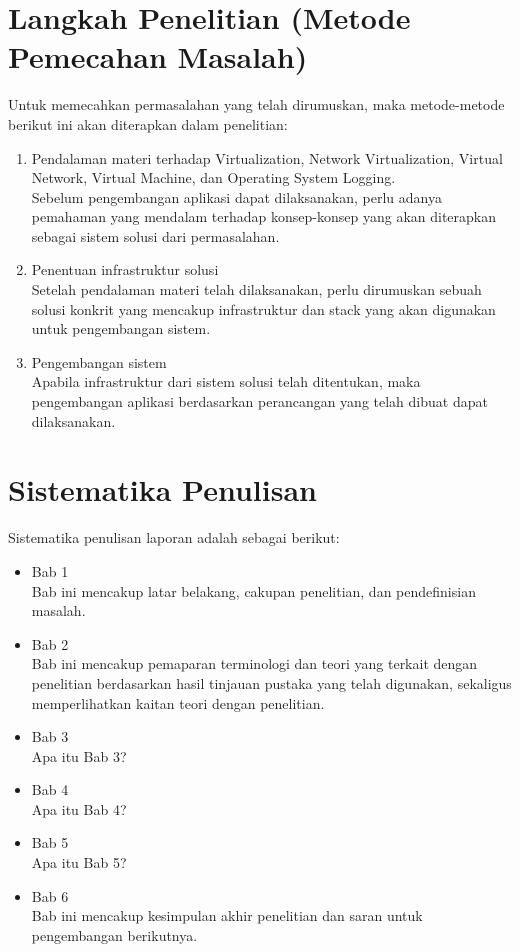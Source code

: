 \section{Langkah Penelitian (Metode Pemecahan Masalah)}
\label{sec:langkahPenelitian}
Untuk memecahkan permasalahan yang telah dirumuskan, maka metode-metode berikut ini akan diterapkan dalam penelitian:
\begin{enumerate}
	\item Pendalaman materi terhadap Virtualization, Network Virtualization, Virtual Network, Virtual Machine, dan Operating System Logging. \\
	Sebelum pengembangan aplikasi dapat dilaksanakan, perlu adanya pemahaman yang mendalam terhadap konsep-konsep yang akan diterapkan sebagai sistem solusi dari permasalahan.
	\item Penentuan infrastruktur solusi \\
	Setelah pendalaman materi telah dilaksanakan, perlu dirumuskan sebuah solusi konkrit yang mencakup infrastruktur dan stack yang akan digunakan untuk pengembangan sistem.
	\item Pengembangan sistem \\
	Apabila infrastruktur dari sistem solusi telah ditentukan, maka pengembangan aplikasi berdasarkan perancangan yang telah dibuat dapat dilaksanakan.
\end{enumerate}


\section{Sistematika Penulisan}
\label{sec:sistematikaPenulisan}
Sistematika penulisan laporan adalah sebagai berikut:
\begin{itemize}
	\item Bab 1 \babSatu \\
	    Bab ini mencakup latar belakang, cakupan penelitian, dan pendefinisian masalah.
	\item Bab 2 \babDua \\
	    Bab ini mencakup pemaparan terminologi dan teori yang terkait dengan penelitian berdasarkan hasil tinjauan pustaka yang telah digunakan, sekaligus memperlihatkan kaitan teori dengan penelitian.
	\item Bab 3 \babTiga \\
	    Apa itu Bab 3?
	\item Bab 4 \babEmpat \\
		Apa itu Bab 4?
	\item Bab 5 \babLima \\
	    Apa itu Bab 5?
	\item Bab 6 \kesimpulan \\
	    Bab ini mencakup kesimpulan akhir penelitian dan saran untuk pengembangan berikutnya.
\end{itemize}

\noindent{}
